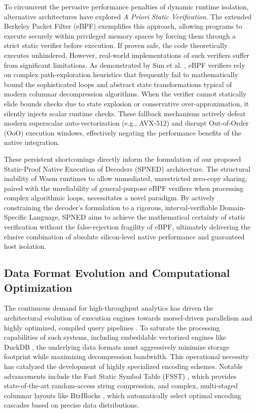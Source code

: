 \documentclass[onecolumn]{IEEEtran}
\numberwithin{equation}{section}
\theoremstyle{definition}
\theoremstyle{remark}
\begin{document}
To circumvent the pervasive performance penalties of dynamic runtime isolation, alternative architectures have explored \textit{A Priori Static Verification}. The extended Berkeley Packet Filter (eBPF) \cite{borkmann2023bpf} exemplifies this approach, allowing programs to execute securely within privileged memory spaces by forcing them through a strict static verifier before execution. If proven safe, the code theoretically executes unhindered. However, real-world implementations of such verifiers suffer from significant limitations. As demonstrated by Sun et al. \cite{sun2024finding}, eBPF verifiers rely on complex path-exploration heuristics that frequently fail to mathematically bound the sophisticated loops and abstract state transformations typical of modern columnar decompression algorithms. When the verifier cannot statically elide bounds checks due to state explosion or conservative over-approximation, it silently injects scalar runtime checks. These fallback mechanisms actively defeat modern superscalar auto-vectorization (e.g., AVX-512) and disrupt Out-of-Order (OoO) execution windows, effectively negating the performance benefits of the native integration.

These persistent shortcomings directly inform the formulation of our proposed Static-Proof Native Execution of Decoders (SPNED) architecture. The structural inability of Wasm runtimes \cite{bytecode2019wasmtime} to allow unmediated, unrestricted zero-copy sharing, paired with the unreliability of general-purpose eBPF verifiers \cite{sun2024finding} when processing complex algorithmic loops, necessitates a novel paradigm. By actively constraining the decoder's formulation to a rigorous, interval-verifiable Domain-Specific Language, SPNED aims to achieve the mathematical certainty of static verification without the false-rejection fragility of eBPF, ultimately delivering the elusive combination of absolute silicon-level native performance and guaranteed host isolation.

\subsection{Data Format Evolution and Computational Optimization}

The continuous demand for high-throughput analytics has driven the architectural evolution of execution engines towards morsel-driven parallelism \cite{leis2014morsel} and highly optimized, compiled query pipelines \cite{neumann2020umbra}. To saturate the processing capabilities of such systems, including embeddable vectorized engines like DuckDB \cite{raasveldt2019duckdb}, the underlying data formats must aggressively minimize storage footprint while maximizing decompression bandwidth. This operational necessity has catalyzed the development of highly specialized encoding schemes. Notable advancements include the Fast Static Symbol Table (FSST) \cite{boncz2020fsst}, which provides state-of-the-art random-access string compression, and complex, multi-staged columnar layouts like BtrBlocks \cite{kuschewski2023btrblocks}, which automatically select optimal encoding cascades based on precise data distributions.
\end{document}
